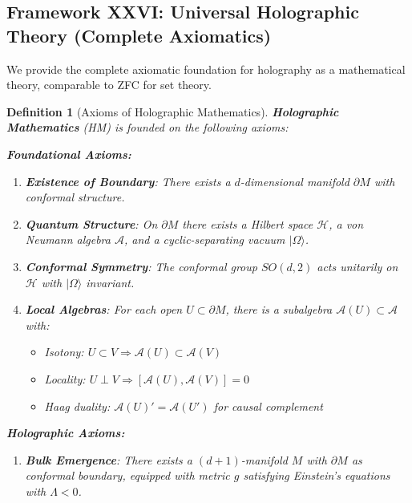 \documentclass[12pt,a4paper]{article}
\newtheorem{definition}[theorem]{Definition}
\begin{document}
\subsection{Framework XXVI: Universal Holographic Theory (Complete Axiomatics)}

We provide the complete axiomatic foundation for holography as a mathematical theory, comparable to ZFC for set theory.

\begin{definition}[Axioms of Holographic Mathematics]\label{def:axioms-holo}
\textbf{Holographic Mathematics} (HM) is founded on the following axioms:

\textbf{Foundational Axioms:}
\begin{enumerate}
    \item[\textbf{HM1.}] \textbf{Existence of Boundary}: There exists a $d$-dimensional manifold $\partial M$ with conformal structure.
    
    \item[\textbf{HM2.}] \textbf{Quantum Structure}: On $\partial M$ there exists a Hilbert space $\mathcal{H}$, a von Neumann algebra $\mathcal{A}$, and a cyclic-separating vacuum $|\Omega\rangle$.
    
    \item[\textbf{HM3.}] \textbf{Conformal Symmetry}: The conformal group $SO(d,2)$ acts unitarily on $\mathcal{H}$ with $|\Omega\rangle$ invariant.
    
    \item[\textbf{HM4.}] \textbf{Local Algebras}: For each open $U \subset \partial M$, there is a subalgebra $\mathcal{A}(U) \subset \mathcal{A}$ with:
    \begin{itemize}
        \item Isotony: $U \subset V \Rightarrow \mathcal{A}(U) \subset \mathcal{A}(V)$
        \item Locality: $U \perp V \Rightarrow [\mathcal{A}(U), \mathcal{A}(V)] = 0$
        \item Haag duality: $\mathcal{A}(U)' = \mathcal{A}(U')$ for causal complement
    \end{itemize}
\end{enumerate}

\textbf{Holographic Axioms:}
\begin{enumerate}
    \item[\textbf{HM5.}] \textbf{Bulk Emergence}: There exists a $(d+1)$-manifold $M$ with $\partial M$ as conformal boundary, equipped with metric $g$ satisfying Einstein's equations with $\Lambda < 0$.
    

\end{enumerate}
\end{definition}
\end{document}
